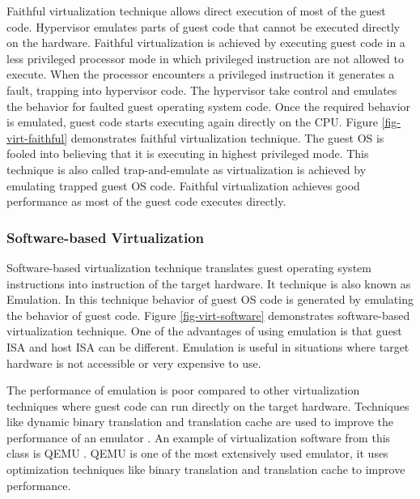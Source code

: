 

Faithful virtualization technique allows direct execution of most of the guest code. 
Hypervisor emulates parts of guest code that cannot be executed directly on the hardware.
Faithful virtualization is achieved by executing guest code in a less privileged processor mode in which privileged instruction are not allowed to execute. 
When the processor encounters a privileged instruction it generates a fault, trapping into hypervisor code.
The hypervisor take control and emulates the behavior for faulted guest operating system code. 
Once the required behavior is emulated, guest code starts executing again directly on the CPU.
Figure \ref{fig-virt-faithful} demonstrates faithful virtualization technique.
The guest OS is fooled into believing that it is executing in highest privileged mode.  
This technique is also called trap-and-emulate as virtualization is achieved by emulating trapped guest OS code.   
Faithful virtualization achieves good performance as most of the guest code executes directly. 


\subsubsection{Software-based Virtualization}
Software-based virtualization technique translates guest operating system instructions into instruction of the target hardware.
It technique is also known as Emulation. 
In this technique behavior of guest OS code is generated by emulating the behavior of guest code. 
Figure \ref{fig-virt-software} demonstrates software-based virtualization technique.
One of the advantages of using emulation is that guest ISA and host ISA can be different. 
Emulation is useful in situations where target hardware is not accessible or very expensive to use. 


The performance of emulation is poor compared to other virtualization techniques where guest code can run directly on the target hardware. 
Techniques like dynamic binary translation and translation cache are used to improve the performance of an emulator \cite{ebcioglu2001dynamic}.
An example of virtualization software from this class is QEMU \cite{bellard2005qemu}.
QEMU is one of the most extensively used emulator, it uses optimization techniques like binary translation and translation cache to improve performance. 

